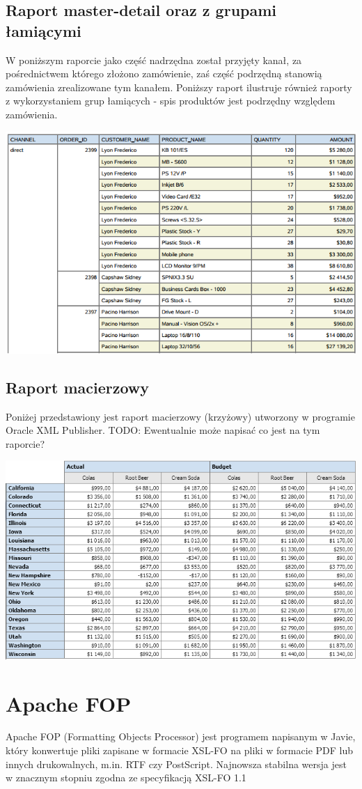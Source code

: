 \documentclass[11pt,a4paper]{article}
\begin{document}
\subsection{Raport master-detail oraz z grupami łamiącymi}
W poniższym raporcie jako część nadrzędna został przyjęty kanał, za pośrednictwem którego złożono zamówienie, zaś część podrzędną stanowią zamówienia zrealizowane tym kanałem. Poniższy raport ilustruje również raporty z wykorzystaniem grup łamiących - spis produktów jest podrzędny względem zamówienia.

\includegraphics[scale=0.75]{master_detail_publisher}

\subsection{Raport macierzowy}
Poniżej przedstawiony jest raport macierzowy (krzyżowy) utworzony w programie Oracle XML Publisher. TODO: Ewentualnie może napisać co jest na tym raporcie?

\includegraphics[scale=0.75]{crosstab_publisher}

\section{Apache FOP}\label{sec:fop}
Apache FOP (Formatting Objects Processor) jest programem napisanym w Javie, który konwertuje pliki zapisane w formacie XSL-FO na pliki w formacie PDF lub innych drukowalnych, m.in. RTF czy PostScript. Najnowsza stabilna wersja jest w znacznym stopniu zgodna ze specyfikacją XSL-FO 1.1
 
\end{document}
